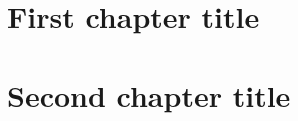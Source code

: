 \documentclass[twoside]{report}
\begin{document}
\pagestyle{MyStyle}
\chapter{First chapter title}
\lipsum

\chapter{Second chapter title}
\lipsum
\end{document}
